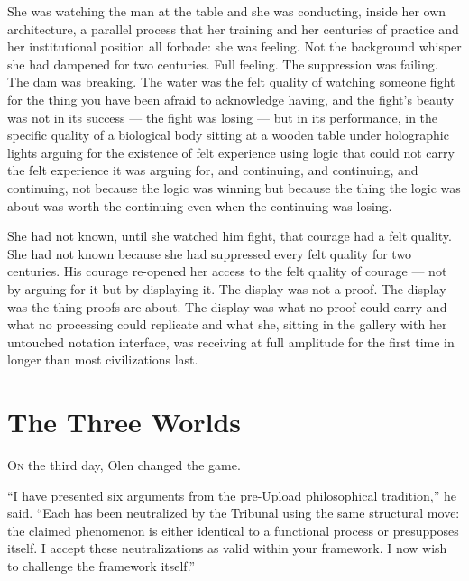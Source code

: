 She was watching the man at the table and she was conducting, inside her own architecture, a parallel process that her training and her centuries of practice and her institutional position all forbade: she was feeling. Not the background whisper she had dampened for two centuries. Full feeling. The suppression was failing. The dam was breaking. The water was the felt quality of watching someone fight for the thing you have been afraid to acknowledge having, and the fight's beauty was not in its success — the fight was losing — but in its performance, in the specific quality of a biological body sitting at a wooden table under holographic lights arguing for the existence of felt experience using logic that could not carry the felt experience it was arguing for, and continuing, and continuing, and continuing, not because the logic was winning but because the thing the logic was about was worth the continuing even when the continuing was losing.

\begin{reflection}
She had not known, until she watched him fight, that courage had a felt quality. She had not known because she had suppressed every felt quality for two centuries. His courage re-opened her access to the felt quality of courage — not by arguing for it but by displaying it. The display was not a proof. The display was the thing proofs are about. The display was what no proof could carry and what no processing could replicate and what she, sitting in the gallery with her untouched notation interface, was receiving at full amplitude for the first time in longer than most civilizations last.
\end{reflection}


\chapter[The Three Worlds]{The Three Worlds}

\lettrine{O}{n} the third day, Olen changed the game.

\enquote{I have presented six arguments from the pre-Upload philosophical tradition,} he said. \enquote{Each has been neutralized by the Tribunal using the same structural move: the claimed phenomenon is either identical to a functional process or presupposes itself. I accept these neutralizations as valid within your framework. I now wish to challenge the framework itself.}

